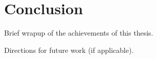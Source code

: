 \chapter{Conclusion}\label{chap:conclusion}

Brief wrapup of the achievements of this thesis.

Directions for future work (if applicable).
